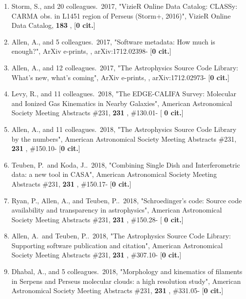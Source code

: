 \documentclass[11pt,letterpaper]{article}
\newcommand{\rsquo}{'}
\begin{document}
\begin{enumerate}[resume,label=\textbf{\arabic*}.]
\item  
Storm, S., and 20 colleagues.\  2017,  "VizieR Online Data Catalog: CLASSy: 
CARMA obs. in L1451 region of Perseus (Storm+, 2016)", VizieR Online Data 
Catalog,  {\bf 183} ,  [{\bf 0 cit.}] 

\item  
Allen, A., and 5 colleagues.\  2017,  "Software metadata: How much is 
enough?", ArXiv e-prints,  , arXiv:1712.02398- [{\bf 0 cit.}] 

\item  
Allen, A., and 12 colleagues.\  2017,  "The Astrophysics Source Code 
Library: What's new, what's coming", ArXiv e-prints,  , arXiv:1712.02973- 
[{\bf 0 cit.}] 

\item  
Levy, R., and 11 colleagues.\  2018,  "The EDGE-CALIFA Survey: 
Molecular and Ionized Gas Kinematics in Nearby Galaxies", American 
Astronomical Society Meeting Abstracts \#231,  {\bf 231} , \#130.01- [{\bf 
0 cit.}] 

\item  
Allen, A., and 11 colleagues.\  2018,  "The Astrophysics Source Code 
Library by the numbers", American Astronomical Society Meeting Abstracts 
\#231,  {\bf 231} , \#150.10- [{\bf 0 cit.}] 

\item  
Teuben, P.~and Koda, J..\  2018,  "Combining Single Dish and 
Interferometric data: a new tool in CASA", American Astronomical Society 
Meeting Abstracts \#231,  {\bf 231} , \#150.17- [{\bf 0 cit.}] 

\item  
Ryan, P., Allen, A., and Teuben, P..\  2018,  "Schroedinger{\rsquo}s code: 
Source code availability and transparency in astrophysics", American 
Astronomical Society Meeting Abstracts \#231,  {\bf 231} , \#150.28- [{\bf 
0 cit.}] 

\item  
Allen, A.~and Teuben, P..\  2018,  "The Astrophysics Source Code Library: 
Supporting software publication and citation", American Astronomical 
Society Meeting Abstracts \#231,  {\bf 231} , \#307.10- [{\bf 0 cit.}] 

\item  
Dhabal, A., and 5 colleagues.\  2018,  "Morphology and kinematics of 
filaments in Serpens and Perseus molecular clouds: a high resolution 
study", American Astronomical Society Meeting Abstracts \#231,  {\bf 231} , 
\#331.05- [{\bf 0 cit.}] 


\end{enumerate}
\end{document}
